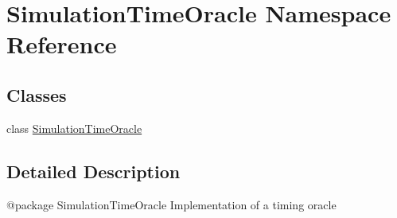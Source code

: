 \hypertarget{namespace_simulation_time_oracle}{}\section{Simulation\+Time\+Oracle Namespace Reference}
\label{namespace_simulation_time_oracle}
\subsection*{Classes}
\begin{DoxyCompactItemize}
\item 
class \mbox{\hyperlink{class_simulation_time_oracle_1_1_simulation_time_oracle}{Simulation\+Time\+Oracle}}
\end{DoxyCompactItemize}


\subsection{Detailed Description}
\begin{DoxyVerb}@package SimulationTimeOracle
Implementation of a timing oracle
\end{DoxyVerb}
 